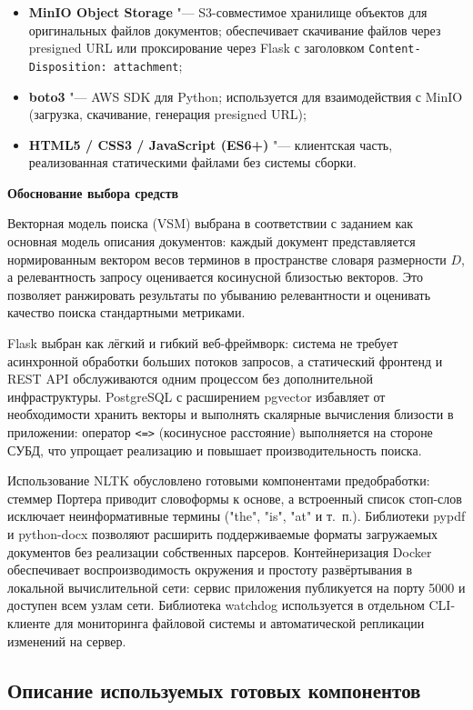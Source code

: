 \begin{itemize}
	\item \textbf{MinIO Object Storage} "--- S3-совместимое хранилище объектов для оригинальных файлов документов; обеспечивает скачивание файлов через presigned URL или проксирование через Flask с заголовком \texttt{Content-Disposition: attachment};
	\item \textbf{boto3} "--- AWS SDK для Python; используется для взаимодействия с MinIO (загрузка, скачивание, генерация presigned URL);
	\item \textbf{HTML5 / CSS3 / JavaScript (ES6+)} "--- клиентская часть, реализованная статическими файлами без системы сборки.
\end{itemize}

\textbf{Обоснование выбора средств}

Векторная модель поиска (VSM) выбрана в соответствии с заданием как основная модель
описания документов: каждый документ представляется нормированным вектором весов
терминов в пространстве словаря размерности $D$, а релевантность запросу оценивается
косинусной близостью векторов. Это позволяет ранжировать результаты по убыванию
релевантности и оценивать качество поиска стандартными метриками.

Flask выбран как лёгкий и гибкий веб-фреймворк: система не требует асинхронной
обработки больших потоков запросов, а статический фронтенд и REST API обслуживаются
одним процессом без дополнительной инфраструктуры. PostgreSQL с расширением pgvector
избавляет от необходимости хранить векторы и выполнять скалярные вычисления близости
в приложении: оператор \texttt{<=>} (косинусное расстояние) выполняется на стороне
СУБД, что упрощает реализацию и повышает производительность поиска.

Использование NLTK обусловлено готовыми компонентами предобработки: стеммер Портера
приводит словоформы к основе, а встроенный список стоп-слов исключает неинформативные
термины ("the", "is", "at" и т.~п.). Библиотеки pypdf и python-docx позволяют расширить
поддерживаемые форматы загружаемых документов без реализации собственных парсеров.
Контейнеризация Docker обеспечивает воспроизводимость окружения и простоту
развёртывания в локальной вычислительной сети: сервис приложения публикуется на порту
5000 и доступен всем узлам сети. Библиотека watchdog используется в отдельном
CLI-клиенте для мониторинга файловой системы и автоматической репликации изменений
на сервер.

\subsection{Описание используемых готовых компонентов}

